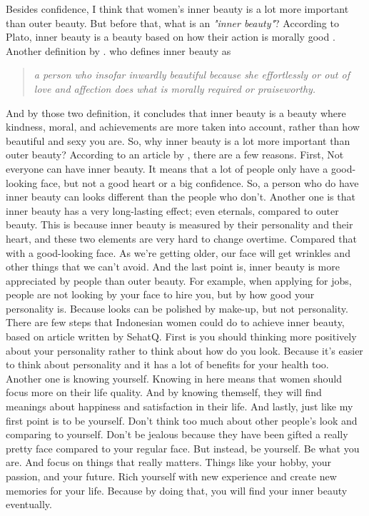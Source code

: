 \documentclass[12pt]{article}
\begin{document}
    Besides confidence, I think that women's inner beauty is a lot more important
    than outer beauty. But before that, what is an \emph{"inner beauty"}? According
    to Plato, inner beauty is a beauty based on how their action is morally good
    \parencite{wisnubrataCaraMemancarkanInner2020}. Another definition by \citeauthor{schmalzriedInnerBeautyFriendshipHypothesis2013}.
    who defines inner beauty as
    \begin{quote}
        \emph{a person who insofar inwardly beautiful
        because she effortlessly or out of love and affection does what is morally
        required or praiseworthy.}
    \end{quote}
    And by those two definition, it concludes that inner beauty is a beauty where 
    kindness, moral, and achievements are more taken into account, rather than 
    how beautiful and sexy you are.
    So, why inner beauty is a lot more important than outer beauty? According to
    an article by \citeauthor[]{fimela.comIniAlasanMengapa2018}, there are a few
    reasons. First, Not everyone can have inner beauty. It means that a lot of people 
    only have a good-looking face, but not a good heart or a big confidence. 
    So, a person who do have inner beauty can looks different than the people
    who don't. Another one is that inner beauty has a very long-lasting effect;
    even eternals, compared to outer beauty. This is because inner beauty is
    measured by their personality and their heart, and these two elements are 
    very hard to change overtime. Compared that with a good-looking face. As we're
    getting older, our face will get wrinkles and other things that we can't avoid.
    And the last point is, inner beauty is more appreciated by people than outer
    beauty. For example, when applying for jobs, people are not looking by your
    face to hire you, but by how good your personality is. Because looks can
    be polished by make-up, but not personality.
    There are few steps that Indonesian women could do to achieve inner beauty,
    based on article written by SehatQ. First is you should thinking more positively 
    about your personality rather to think about how do you look. Because it's easier 
    to think about personality and it has a lot of benefits for your health too.
    Another one is knowing yourself. Knowing in here means that women should 
    focus more on their life quality. And by knowing themself, they will find 
    meanings about happiness and satisfaction in their life.
    And lastly, just like my first point is to be yourself. Don't think too much
    about other people's look and comparing to yourself. Don't be jealous because 
    they have been gifted a really pretty face compared to your regular face. But 
    instead, be yourself. Be what you are. And focus on things that really matters.
    Things like your hobby, your passion, and your future. Rich yourself with 
    new experience and create new memories for your life. Because by doing that,
    you will find your inner beauty eventually.
\end{document}
